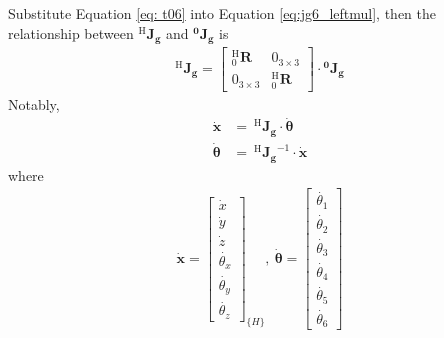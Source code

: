 Substitute Equation \ref{eq: t06} into Equation \ref{eq:jg6_leftmul}, then the relationship between $\mathbf{^\mathrm{H}\!J_g}$  and $\mathbf{^0\!J_g}$ is
\begin{equation}
\begin{split}
\mathbf{^\mathrm{H}\!J_g}
= 
\begin{bmatrix}
^{\mathrm{H}}_0\mathbf{R} & 0_{ 3\times 3} \\ 
0_{ 3\times 3} & ^{\mathrm{H}}_0\mathbf{R}
\end{bmatrix}
\cdot
\mathbf{^0\!J_g}
\end{split}
\end{equation}
Notably,
\begin{equation}
\label{eq:jg6}
\begin{split}
\boldsymbol{\dot{x}} &= \ ^{\mathrm{H}}\!\mathbf{J_g} \cdot \boldsymbol{\dot{\theta}}		\\ 
\boldsymbol{\dot{\theta}} &= \ ^{\mathrm{H}}\!\mathbf{J_g}^{-1} \cdot \boldsymbol{\dot{x}}
\end{split}
\end{equation}
where
\begin{equation*}
\begin{split}
\boldsymbol{\dot{x}}
=
\begin{bmatrix}
\dot{x}\\
\dot{y}\\
\dot{z}\\
\dot{\theta _x}\\
\dot{\theta _y}\\
\dot{\theta _z}
\end{bmatrix}_{\!\{H\}}
,\ 
\boldsymbol{\dot{\theta}}
=
\begin{bmatrix}
\dot{\theta _1} \\ 
\dot{\theta _2} \\ 
\dot{\theta _3} \\ 
\dot{\theta _4} \\ 
\dot{\theta _5} \\ 
\dot{\theta _6} 
\end{bmatrix}
\end{split}
\end{equation*}
